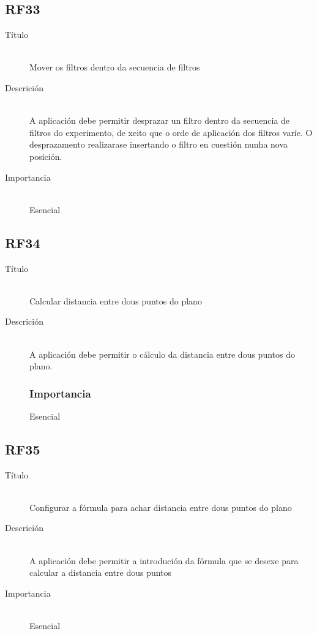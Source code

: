 \subsection*{RF33}
\begin{description}
\item[Título] \hfill \\
Mover os filtros dentro da secuencia de filtros
\item[Descrición] \hfill \\
A aplicación debe permitir desprazar un filtro dentro da secuencia de filtros do experimento, de xeito que o orde de aplicación dos filtros varíe. O desprazamento realizarase insertando o filtro en cuestión nunha nova posición.
\item[Importancia] \hfill \\
Esencial
\end{description}

\subsection*{RF34}
\begin{description}
\item[Título] \hfill \\
Calcular distancia entre dous puntos do plano
\item[Descrición] \hfill \\
A aplicación debe permitir o cálculo da distancia entre dous puntos do plano.
\subsubsection{Importancia}
Esencial
\end{description}

\subsection*{RF35}
\begin{description}
\item[Título] \hfill \\
Configurar a fórmula para achar distancia entre dous puntos do plano
\item[Descrición] \hfill \\
A aplicación debe permitir a introdución da fórmula que se desexe para calcular a distancia entre dous puntos
\item[Importancia] \hfill \\
Esencial
\end{description}


